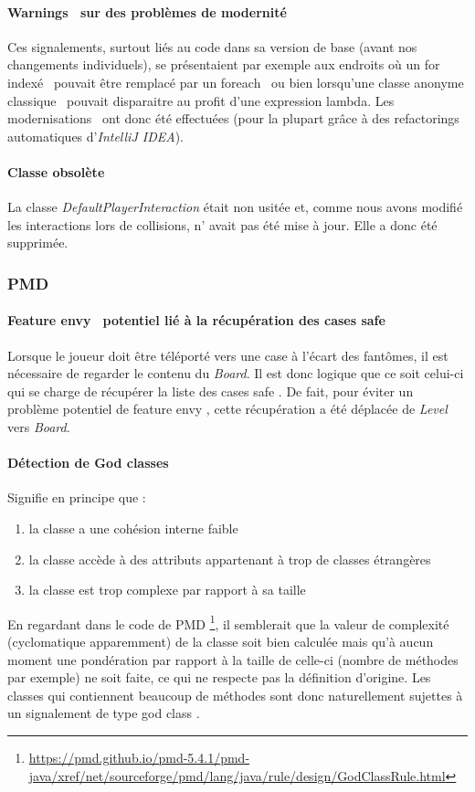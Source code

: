 \documentclass[12pt, openany]{report}
\begin{document}
\paragraph{\og Warnings \fg \ sur des \og problèmes de modernité \fg}
Ces signalements, surtout liés au code dans sa version de base (avant nos changements individuels), se présentaient par exemple aux endroits où un \og for indexé \fg \, pouvait être remplacé par un \og foreach \fg \, ou bien lorsqu'une classe anonyme \og classique \fg \, pouvait disparaitre au profit d'une expression lambda. Les \og modernisations \fg \, ont donc été effectuées (pour la plupart grâce à des \og refactorings \fg \, automatiques d'\textit{IntelliJ IDEA}).

\paragraph{Classe obsolète}
La classe \mbox{\textit{DefaultPlayerInteraction}} était non usitée et, comme nous avons modifié les interactions lors de collisions, n' avait pas été mise à jour.
Elle a donc été supprimée.

\subsubsection*{PMD}
\paragraph{\og Feature envy \fg \, potentiel lié à la récupération des cases \og safe \fg}
Lorsque le joueur doit être téléporté vers une case à l'écart des fantômes, il est nécessaire de regarder le contenu du \textit{Board}. Il est donc logique que ce soit celui-ci qui se charge de récupérer la liste des cases \og safe \fg . De fait, pour éviter un problème potentiel de \og feature envy \fg , cette récupération a été déplacée de \textit{Level} vers \textit{Board}.
\paragraph{Détection de \og God classes \fg}
Signifie en principe que :
\begin{enumerate}
	\item la classe a une \og cohésion interne \fg faible
	\item la classe accède à des attributs appartenant à trop de classes étrangères
	\item la classe est trop complexe par rapport à sa taille
\end{enumerate}
En regardant dans le code de PMD \footnote{\url{https://pmd.github.io/pmd-5.4.1/pmd-java/xref/net/sourceforge/pmd/lang/java/rule/design/GodClassRule.html}}, il semblerait que la valeur de complexité (cyclomatique apparemment) de la classe soit bien calculée mais qu'à aucun moment une pondération par rapport à la taille de celle-ci (nombre de méthodes par exemple) ne soit faite, ce qui ne respecte pas la définition d'origine.
Les classes qui contiennent beaucoup de méthodes sont donc naturellement sujettes à un signalement de type \og god class \fg.
\end{document}
